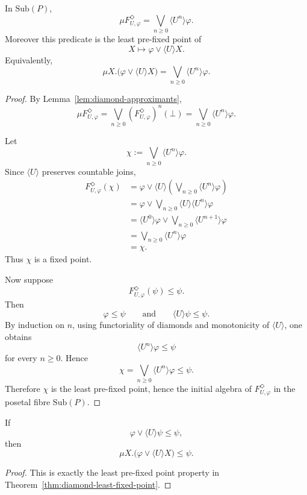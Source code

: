 \begin{theorem}
\label{thm:diamond-least-fixed-point}
In \(\mathrm{Sub}(P)\),
\[
\mu F^\Diamond_{U,\varphi}
=
\bigvee_{n\ge0}\langle U^n\rangle\varphi.
\]
Moreover this predicate is the least pre-fixed point of
\[
X\longmapsto \varphi\vee\langle U\rangle X.
\]
Equivalently,
\[
\mu X.\bigl(\varphi\vee\langle U\rangle X\bigr)
=
\bigvee_{n\ge0}\langle U^n\rangle\varphi.
\]
\end{theorem}

\begin{proof}
By Lemma~\ref{lem:diamond-approximants},
\[
\mu F^\Diamond_{U,\varphi}
=
\bigvee_{n\ge0}(F^\Diamond_{U,\varphi})^n(\bot)
=
\bigvee_{n\ge0}\langle U^n\rangle\varphi.
\]

Let
\[
\chi:=
\bigvee_{n\ge0}\langle U^n\rangle\varphi.
\]
Since \(\langle U\rangle\) preserves countable joins,
\[
\begin{aligned}
F^\Diamond_{U,\varphi}(\chi)
&=
\varphi\vee\langle U\rangle
\left(
\bigvee_{n\ge0}\langle U^n\rangle\varphi
\right)
\\
&=
\varphi
\vee
\bigvee_{n\ge0}
\langle U\rangle\langle U^n\rangle\varphi
\\
&=
\langle U^0\rangle\varphi
\vee
\bigvee_{n\ge0}
\langle U^{n+1}\rangle\varphi
\\
&=
\bigvee_{n\ge0}\langle U^n\rangle\varphi
\\
&=
\chi.
\end{aligned}
\]
Thus \(\chi\) is a fixed point.

Now suppose
\[
F^\Diamond_{U,\varphi}(\psi)\le \psi.
\]
Then
\[
\varphi\le\psi
\qquad
\text{and}
\qquad
\langle U\rangle\psi\le\psi.
\]
By induction on \(n\), using functoriality of diamonds and monotonicity of \(\langle U\rangle\), one obtains
\[
\langle U^n\rangle\varphi\le\psi
\]
for every \(n\ge0\). Hence
\[
\chi=
\bigvee_{n\ge0}\langle U^n\rangle\varphi
\le
\psi.
\]
Therefore \(\chi\) is the least pre-fixed point, hence the initial algebra of \(F^\Diamond_{U,\varphi}\) in the posetal fibre \(\mathrm{Sub}(P)\).
\end{proof}

\begin{corollary}
\label{cor:diamond-induction-principle}
If
\[
\varphi\vee\langle U\rangle\psi\le\psi,
\]
then
\[
\mu X.\bigl(\varphi\vee\langle U\rangle X\bigr)
\le
\psi.
\]
\end{corollary}

\begin{proof}
This is exactly the least pre-fixed point property in Theorem~\ref{thm:diamond-least-fixed-point}.
\end{proof}

